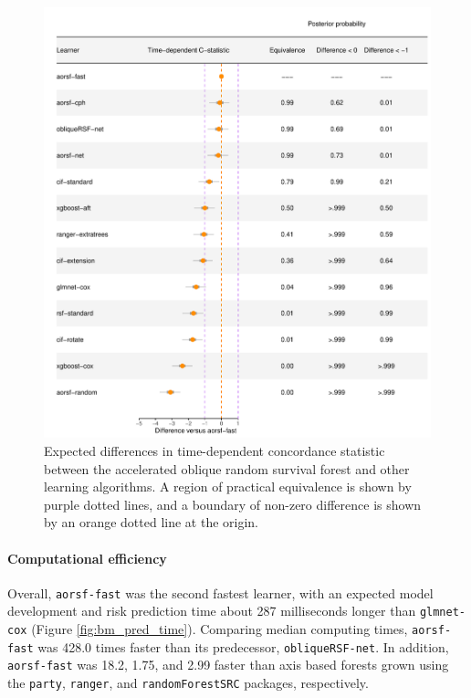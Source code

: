 \documentclass{article}\usepackage[]{graphicx}\usepackage[]{xcolor}
\makeatletter
\def\maxwidth{ %
  \ifdim\Gin@nat@width>\linewidth
    \linewidth
  \else
    \Gin@nat@width
  \fi
}
\newenvironment{knitrout}{}{} %
\makeatother
\begin{document}
\begin{knitrout}
\color{fgcolor}\begin{figure}
\includegraphics[width=\maxwidth]{figure/bm_pred_model_viz_cstat-1} \caption[Expected differences in time-dependent concordance statistic between the accelerated oblique random survival forest and other learning algorithms]{Expected differences in time-dependent concordance statistic between the accelerated oblique random survival forest and other learning algorithms. A region of practical equivalence is shown by purple dotted lines, and a boundary of non-zero difference is shown by an orange dotted line at the origin.}\label{fig:bm_pred_model_viz_cstat}
\end{figure}

\end{knitrout}




\paragraph{Computational efficiency}

Overall, \texttt{aorsf-fast} was the second fastest learner, with an expected model development and risk prediction time about 287 milliseconds longer than \texttt{glmnet-cox} (Figure \ref{fig:bm_pred_time}). Comparing median computing times, \texttt{aorsf-fast} was 428.0 times faster than its predecessor, \texttt{obliqueRSF-net}. In addition, \texttt{aorsf-fast} was 18.2, 1.75, and 2.99 faster than axis based forests grown using the \texttt{party}, \texttt{ranger}, and \texttt{randomForestSRC} packages, respectively.
\end{document}
